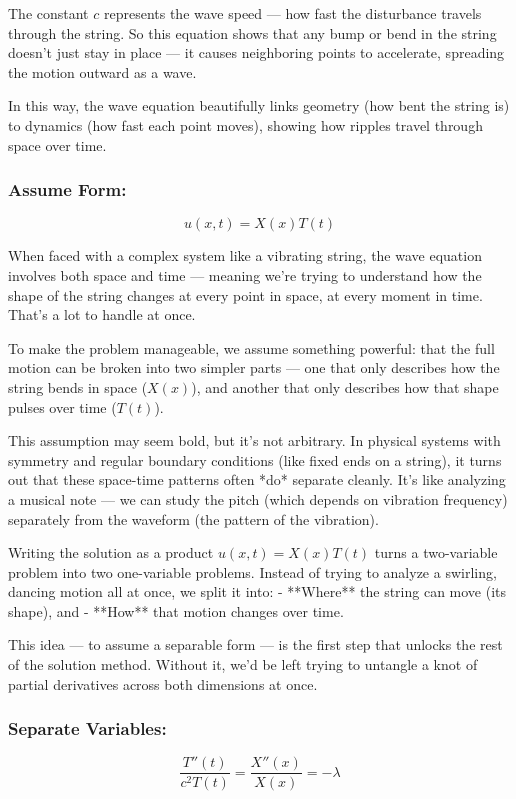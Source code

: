 The constant \( c \) represents the wave speed — how fast the disturbance travels through the string. So this equation shows that any bump or bend in the string doesn’t just stay in place — it causes neighboring points to accelerate, spreading the motion outward as a wave.

In this way, the wave equation beautifully links geometry (how bent the string is) to dynamics (how fast each point moves), showing how ripples travel through space over time.


\subsubsection{Assume Form: }

\[
u(x,t) = X(x)T(t)
\]

When faced with a complex system like a vibrating string, the wave equation involves both space and time — meaning we’re trying to understand how the shape of the string changes at every point in space, at every moment in time. That’s a lot to handle at once.

To make the problem manageable, we assume something powerful: that the full motion can be broken into two simpler parts — one that only describes how the string bends in space (\( X(x) \)), and another that only describes how that shape pulses over time (\( T(t) \)).

This assumption may seem bold, but it’s not arbitrary. In physical systems with symmetry and regular boundary conditions (like fixed ends on a string), it turns out that these space-time patterns often *do* separate cleanly. It’s like analyzing a musical note — we can study the pitch (which depends on vibration frequency) separately from the waveform (the pattern of the vibration).

Writing the solution as a product \( u(x,t) = X(x)T(t) \) turns a two-variable problem into two one-variable problems. Instead of trying to analyze a swirling, dancing motion all at once, we split it into:  
- **Where** the string can move (its shape), and  
- **How** that motion changes over time.

This idea — to assume a separable form — is the first step that unlocks the rest of the solution method. Without it, we’d be left trying to untangle a knot of partial derivatives across both dimensions at once.

\subsubsection{Separate Variables:}
\[
\frac{T''(t)}{c^2 T(t)} = \frac{X''(x)}{X(x)} = -\lambda
\]

